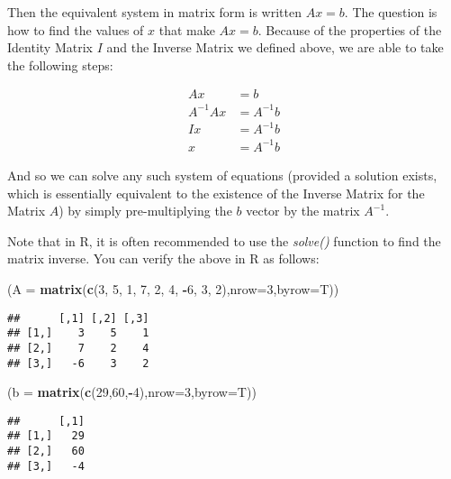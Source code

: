 \documentclass[]{book}
\newenvironment{Shaded}{\begin{snugshade}}{\end{snugshade}}
\newcommand{\KeywordTok}[1]{\textcolor[rgb]{0.13,0.29,0.53}{\textbf{#1}}}
\newcommand{\DataTypeTok}[1]{\textcolor[rgb]{0.13,0.29,0.53}{#1}}
\newcommand{\DecValTok}[1]{\textcolor[rgb]{0.00,0.00,0.81}{#1}}
\newcommand{\OperatorTok}[1]{\textcolor[rgb]{0.81,0.36,0.00}{\textbf{#1}}}
\newcommand{\NormalTok}[1]{#1}
\theoremstyle{definition}
\theoremstyle{definition}
\theoremstyle{definition}
\theoremstyle{remark}
\begin{document}
Then the equivalent system in matrix form is written \(Ax = b\). The
question is how to find the values of \(x\) that make \(Ax = b\).
Because of the properties of the Identity Matrix \(I\) and the Inverse
Matrix we defined above, we are able to take the following steps:

\begin{align*}
Ax &= b \\
A^{-1}Ax &= A^{-1}b \\
Ix &= A^{-1}b\\
x &= A^{-1}b
\end{align*}

And so we can solve any such system of equations (provided a solution
exists, which is essentially equivalent to the existence of the Inverse
Matrix for the Matrix \(A\)) by simply pre-multiplying the \(b\) vector
by the matrix \(A^{-1}\).

Note that in R, it is often recommended to use the \textit{solve()}
function to find the matrix inverse. You can verify the above in R as
follows:

\begin{Shaded}
\begin{Highlighting}[]
\NormalTok{(}\DataTypeTok{A =} \KeywordTok{matrix}\NormalTok{(}\KeywordTok{c}\NormalTok{(}\DecValTok{3}\NormalTok{, }\DecValTok{5}\NormalTok{, }\DecValTok{1}\NormalTok{, }\DecValTok{7}\NormalTok{, }\DecValTok{2}\NormalTok{, }\DecValTok{4}\NormalTok{, }\OperatorTok{-}\DecValTok{6}\NormalTok{, }\DecValTok{3}\NormalTok{, }\DecValTok{2}\NormalTok{),}\DataTypeTok{nrow=}\DecValTok{3}\NormalTok{,}\DataTypeTok{byrow=}\NormalTok{T))}
\end{Highlighting}
\end{Shaded}

\begin{verbatim}
##      [,1] [,2] [,3]
## [1,]    3    5    1
## [2,]    7    2    4
## [3,]   -6    3    2
\end{verbatim}

\begin{Shaded}
\begin{Highlighting}[]
\NormalTok{(}\DataTypeTok{b =} \KeywordTok{matrix}\NormalTok{(}\KeywordTok{c}\NormalTok{(}\DecValTok{29}\NormalTok{,}\DecValTok{60}\NormalTok{,}\OperatorTok{-}\DecValTok{4}\NormalTok{),}\DataTypeTok{nrow=}\DecValTok{3}\NormalTok{,}\DataTypeTok{byrow=}\NormalTok{T))}
\end{Highlighting}
\end{Shaded}

\begin{verbatim}
##      [,1]
## [1,]   29
## [2,]   60
## [3,]   -4
\end{verbatim}
\end{document}
